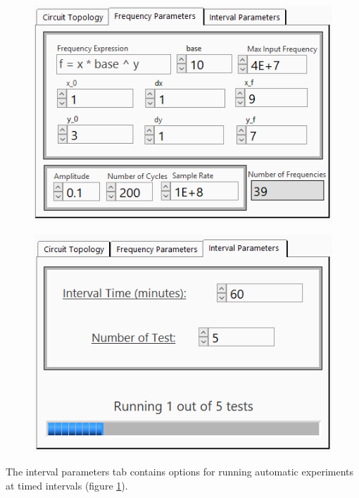 \begin{figure}[h]
\centering
\begin{minipage}[t]{.48\textwidth}
  \centering
  \includegraphics[width=\textwidth]{images/labview_freq.png}
  \label{fig:labview_frequency_settings}
\end{minipage}
\hfill
\begin{minipage}[t]{.48\textwidth}
  \centering
  \includegraphics[width=\textwidth]{images/labview_intervals.png}
  \label{fig:labview_interval_settings}
\end{minipage}
\end{figure}

\par The interval parameters tab contains options for running automatic experiments at timed intervals (figure \ref{fig:labview_interval_settings}). 

